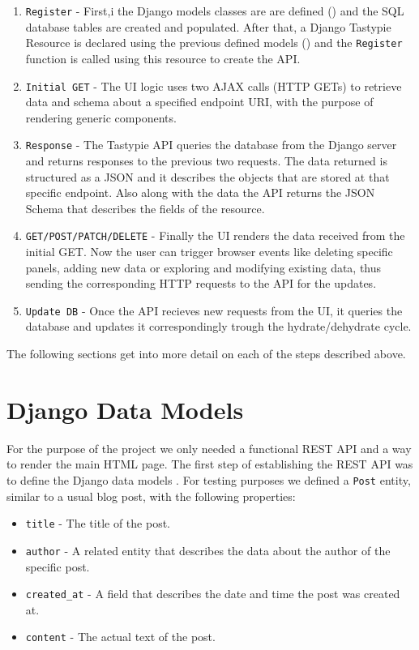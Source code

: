 \begin{enumerate}
	\item \texttt{Register} - First,i the Django models classes are are defined () and the SQL database tables are created and populated. After that, a Django Tastypie Resource is declared using the previous defined models () and the \texttt{Register} function is called using this resource to create the API.
	\item \texttt{Initial GET} - The UI logic uses two AJAX calls (HTTP GETs) to retrieve data and schema about a specified endpoint URI, with the purpose of rendering generic components.
	\item \texttt{Response} - The Tastypie API queries the database from the Django server and returns responses to the previous two requests. The data returned is structured as a JSON and it describes the objects that are stored at that specific endpoint. Also along with the data the API returns the JSON Schema that describes the fields of the resource.
	\item \texttt{GET/POST/PATCH/DELETE} - Finally the UI renders the data received from the initial GET. Now the user can trigger browser events like deleting specific panels, adding new data or exploring and modifying existing data, thus sending the corresponding HTTP requests to the API for the updates.
	\item \texttt{Update DB} - Once the API recieves new requests from the UI, it queries the database and updates it correspondingly trough the hydrate/dehydrate cycle.
	
\end{enumerate}

The following sections get into more detail on each of the steps described above.

\section{Django Data Models}
\label{sec:django-models}

For the purpose of the project we only needed a functional REST API and a way to render the main HTML page. The first step of establishing the REST API was to define the Django data models \cite{book2}. For testing purposes we defined a \texttt{Post} entity, similar to a usual blog post, with the following properties:

\begin{itemize}
	\item \texttt{title} - The title of the post.
	\item \texttt{author} - A related entity that describes the data about the author of the specific post.
	\item \texttt{created\_at} - A field that describes the date and time the post was created at.
	\item \texttt{content} - The actual text of the post.
\end{itemize}

